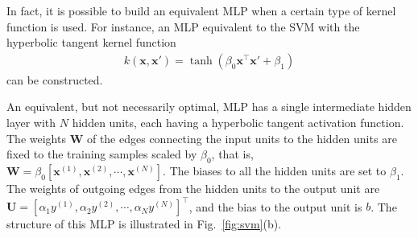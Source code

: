 \documentclass[dissertation,nocontribution]{aaltoseries}
\newcommand{\vect}[1]{\mathbf{#1}}
\newcommand{\matr}[1]{\mathbf{#1}}
\newcommand{\vx}[0]{\vect{x}}
\newcommand{\mW}[0]{\matr{W}}
\newcommand{\mU}[0]{\matr{U}}
\begin{document}
In fact, it is possible to build an equivalent MLP when a
certain type of kernel function is used. For instance, an
MLP equivalent to the SVM with the hyperbolic tangent kernel
function %
\begin{align*}
    k(\vx, \vx') = \tanh(\beta_0 \vx^\top \vx' + \beta_1)
\end{align*}
can be constructed.

An equivalent, but not necessarily optimal, MLP has a
single intermediate hidden layer with $N$ hidden units, each
having a hyperbolic tangent activation function. The weights
$\mW$ of the edges connecting the input units to the hidden
units are fixed to the training samples scaled by $\beta_0$,
that is, $\mW = \beta_0 \left[ \vx^{(1)}, \vx^{(2)}, \cdots,
\vx^{(N)} \right]$. The biases to all the hidden units are
set to $\beta_1$. The weights of outgoing edges from the
hidden units to the output unit are $\mU = \left[ \alpha_1 y^{(1)}, \alpha_2 y^{(2)}, \cdots, \alpha_N y^{(N)}
\right]^\top$, and the bias to the output unit is $b$. The
structure of this MLP is illustrated in
Fig.~\ref{fig:svm}(b).
\end{document}
